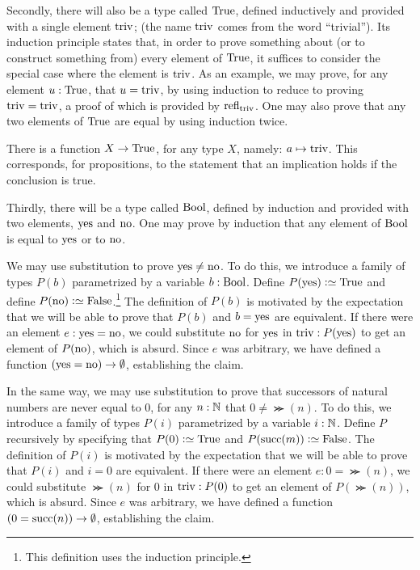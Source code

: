 Secondly, there will also be a type called $\mathrm{True}$, defined inductively and provided with a single element $\mathrm{triv}$; (the name $\mathrm{triv}$ comes from the word
  ``trivial'').  Its induction principle
states that, in order to prove something about (or to construct something from) every element of $\mathrm{True}$, it suffices to consider the special
case where the element is $\mathrm{triv}$.  As an example, we may prove, for any element $u : \mathrm{True}$, that $u=\mathrm{triv}$, by using induction to reduce
to proving $\mathrm{triv}=\mathrm{triv}$, a proof of which is provided by $\mathrm{refl}_{\mathrm{triv}}$.  One may also prove that any two elements of $\mathrm{True}$ are equal by using induction twice.

There is a function $X \to \mathrm{True}$, for any type $X$, namely: $a \mapsto \mathrm{triv}$.  This corresponds, for propositions, to the statement that an
implication holds if the conclusion is true.

Thirdly, there will be a type called $\mathrm{Bool}$,
defined by induction and provided with two elements, $\mathrm{yes}$ and $\mathrm{no}$.
One may prove by induction
that any element of $\mathrm{Bool}$ is equal to $\mathrm{yes}$ or to $\mathrm{no}$.

We may use substitution to prove $\mathrm{yes} \ne \mathrm{no}$.  To do this, we introduce a family of types $P(b)$ parametrized by a variable $b:\mathrm{Bool}$.
Define $P(\yes) \defeq \true$ and define $P(\no) \defeq \false$.\footnote{%
  This definition uses the induction principle.}
The definition of $P(b)$ is motivated by the expectation that we will be able
to prove that $P(b)$ and $b = \mathrm{yes}$ are equivalent.  If there were an element $e: \mathrm{yes} = \mathrm{no}$, we could substitute $\mathrm{no}$ for $\mathrm{yes}$ in $\mathrm{triv} :
P (\mathrm{yes})$ to get an element of $P(\mathrm{no})$, which is absurd.  Since $e$ was arbitrary, we have defined a function $(\mathrm{yes}=\mathrm{no}) \to \emptyset$,
establishing the claim.

In the same way, we may use substitution to prove that successors of natural numbers are never equal to $0$, \ie for any $n:\mathbb{N}$ that $0 \ne
\Succ(n)$.  To do this, we introduce a family of types $P(i)$ parametrized by a variable $i:\mathbb{N}$.  Define $P$ recursively by specifying that $P(0)
\defeq \true$ and $P(\Succ(m)) \defeq \false$.  The definition of $P(i)$ is motivated by the expectation that we will be able to prove that $P(i)$
and $i = 0$ are equivalent.  If there were an element $e: 0 = \Succ(n)$, we could substitute $\Succ(n)$ for $0$ in $\mathrm{triv} : P ( 0 )$ to get an element
of $P(\Succ(n))$, which is absurd.  Since $e$ was arbitrary, we have defined a function $(0=\Succ(n)) \to \emptytype$, establishing the claim.

